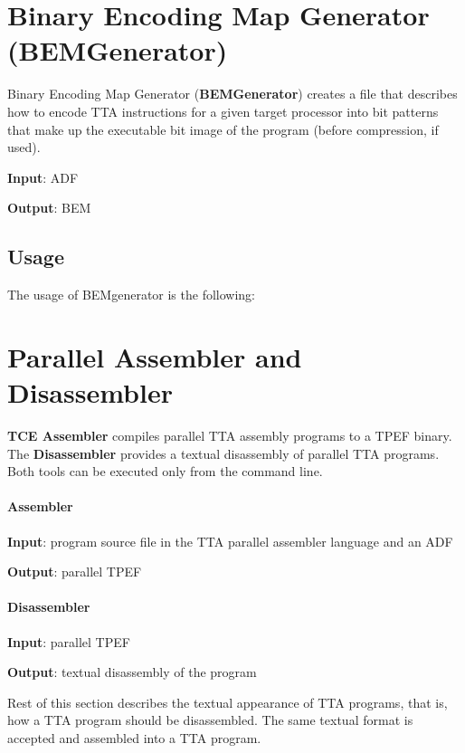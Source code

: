 \documentclass[a4paper,twoside]{tceusermanual}
\begin{document}
\section{Binary Encoding Map Generator (BEMGenerator)}
\label{section:bemgen}
Binary Encoding Map Generator (\textbf{BEMGenerator}) creates a file that
describes how to encode TTA instructions for a given target processor into
bit patterns that make up the executable bit image of the program (before
compression, if used).

\textbf{Input}: ADF

\textbf{Output}: BEM

\subsection{Usage}

The usage of BEMgenerator is the following:


\section{Parallel Assembler and Disassembler}
\label{section:TCEAsm}

\textbf{TCE Assembler} compiles parallel TTA assembly programs to a TPEF
binary. The \textbf{Disassembler} provides a textual disassembly of
parallel TTA programs. Both tools can be executed only from the command
line.

\paragraph{Assembler}

\textbf{Input}: program source file in the TTA parallel assembler language
and an ADF

\textbf{Output}: parallel TPEF

\paragraph{Disassembler}

\textbf{Input}: parallel TPEF

\textbf{Output}: textual disassembly of the program

Rest of this section describes the textual appearance of TTA programs, that
is, how a TTA program should be disassembled.  The same textual format is
accepted and assembled into a TTA program.
\end{document}
